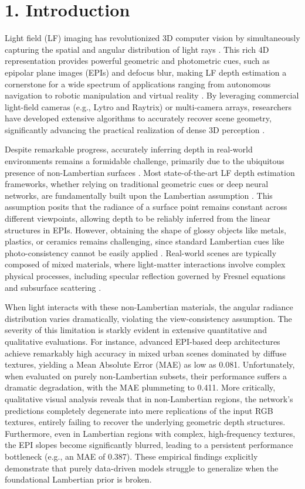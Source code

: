 \section{1. Introduction}

Light field (LF) imaging has revolutionized 3D computer vision by simultaneously capturing the spatial and angular distribution of light rays . This rich 4D representation provides powerful geometric and photometric cues, such as epipolar plane images (EPIs) and defocus blur, making LF depth estimation a cornerstone for a wide spectrum of applications ranging from autonomous navigation to robotic manipulation and virtual reality . By leveraging commercial light-field cameras (e.g., Lytro and Raytrix) or multi-camera arrays, researchers have developed extensive algorithms to accurately recover scene geometry, significantly advancing the practical realization of dense 3D perception .

Despite remarkable progress, accurately inferring depth in real-world environments remains a formidable challenge, primarily due to the ubiquitous presence of non-Lambertian surfaces . Most state-of-the-art LF depth estimation frameworks, whether relying on traditional geometric cues or deep neural networks, are fundamentally built upon the Lambertian assumption . This assumption posits that the radiance of a surface point remains constant across different viewpoints, allowing depth to be reliably inferred from the linear structures in EPIs. However, obtaining the shape of glossy objects like metals, plastics, or ceramics remains challenging, since standard Lambertian cues like photo-consistency cannot be easily applied . Real-world scenes are typically composed of mixed materials, where light-matter interactions involve complex physical processes, including specular reflection governed by Fresnel equations and subsurface scattering . 

When light interacts with these non-Lambertian materials, the angular radiance distribution varies dramatically, violating the view-consistency assumption. The severity of this limitation is starkly evident in extensive quantitative and qualitative evaluations. For instance, advanced EPI-based deep architectures achieve remarkably high accuracy in mixed urban scenes dominated by diffuse textures, yielding a Mean Absolute Error (MAE) as low as 0.081. Unfortunately, when evaluated on purely non-Lambertian subsets, their performance suffers a dramatic degradation, with the MAE plummeting to 0.411. More critically, qualitative visual analysis reveals that in non-Lambertian regions, the network's predictions completely degenerate into mere replications of the input RGB textures, entirely failing to recover the underlying geometric depth structures. Furthermore, even in Lambertian regions with complex, high-frequency textures, the EPI slopes become significantly blurred, leading to a persistent performance bottleneck (e.g., an MAE of 0.387). These empirical findings explicitly demonstrate that purely data-driven models struggle to generalize when the foundational Lambertian prior is broken.

